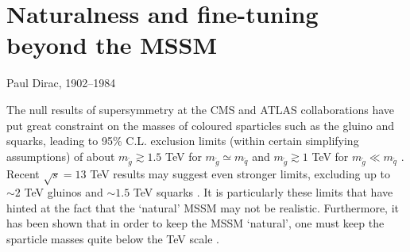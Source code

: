 \chapter{Naturalness and fine-tuning beyond the MSSM}
\label{chap:finetuning}

%
{Paul Dirac, 1902--1984}

\noindent
The null results of supersymmetry at the CMS and ATLAS collaborations have put great constraint on the masses of coloured sparticles such as the gluino and squarks, leading to 95\% C.L. exclusion limits (within certain simplifying assumptions) of about $m_{\tilde{g}} \gtrsim 1.5$ TeV for $m_{\tilde{g}} \simeq m_{\tilde{q}}$ and $m_{\tilde{g}} \gtrsim 1$ TeV for $m_{\tilde{g}} \ll m_{\tilde{q}}$ \cite{RN567,RN568,RN569,RN693,RN695}. Recent $\sqrt{s}=13$ TeV results may suggest even stronger limits, excluding up to $\sim 2$ TeV gluinos and $\sim 1.5$ TeV squarks \cite{RN697,RN698}. It is particularly these limits that have hinted at the fact that the `natural' MSSM may not be realistic. Furthermore, it has been shown that in order to keep the MSSM `natural', one must keep the sparticle masses quite below the TeV scale \cite{RN699,RN239,RN700,RN701,RN703,RN702,RN704,RN705,RN706,RN707,RN708,RN710,RN709,RN711,RN712,RN713,RN714,RN715,RN716,RN717,RN719,RN720,RN721,RN722,RN691,RN723,RN724,RN69,RN5,RN253}.

